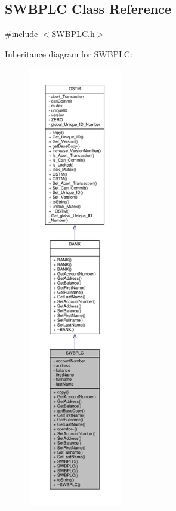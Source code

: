 \hypertarget{class_s_w_b_p_l_c}{}\subsection{S\+W\+B\+P\+LC Class Reference}
\label{class_s_w_b_p_l_c}


{\ttfamily \#include $<$S\+W\+B\+P\+L\+C.\+h$>$}



Inheritance diagram for S\+W\+B\+P\+LC\+:
\nopagebreak
\begin{figure}[H]
\begin{center}
\leavevmode
\includegraphics[height=550pt]{class_s_w_b_p_l_c__inherit__graph}
\end{center}
\end{figure}


